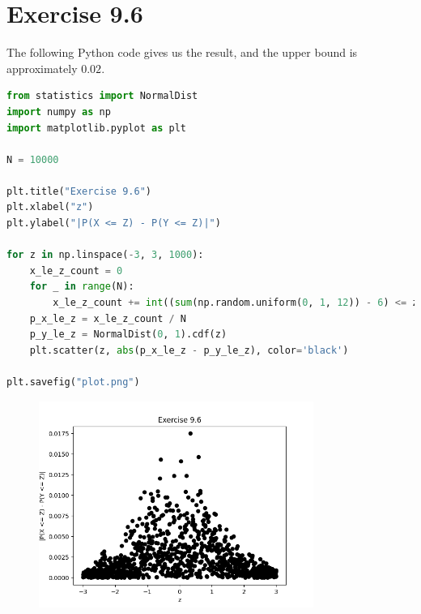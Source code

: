 \documentclass{article}
\begin{document}
\section*{Exercise 9.6}
The following Python code gives us the result, and the upper bound is approximately $0.02$.
\begin{lstlisting}[language=Python]
from statistics import NormalDist
import numpy as np
import matplotlib.pyplot as plt

N = 10000

plt.title("Exercise 9.6")
plt.xlabel("z")
plt.ylabel("|P(X <= Z) - P(Y <= Z)|")

for z in np.linspace(-3, 3, 1000):
    x_le_z_count = 0
    for _ in range(N):
        x_le_z_count += int((sum(np.random.uniform(0, 1, 12)) - 6) <= z)
    p_x_le_z = x_le_z_count / N
    p_y_le_z = NormalDist(0, 1).cdf(z)
    plt.scatter(z, abs(p_x_le_z - p_y_le_z), color='black')

plt.savefig("plot.png")
\end{lstlisting}
\begin{figure}[H]
    \centering
    \includegraphics[width=0.8\textwidth]{"plot.png"}
\end{figure}
\end{document}
